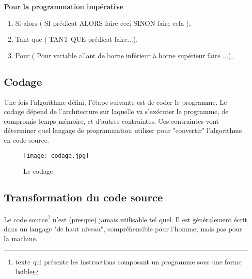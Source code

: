 \documentclass[12pt,a4paper]{article}
\begin{document}
    
    \textbf{\underline{Pour la programmation impérative}}\\
    
    \begin{enumerate}
        \item Si alors ( SI prédicat ALORS faire ceci SINON faire cela ),
        \item Tant que ( TANT QUE prédicat faire...),
        \item Pour ( Pour variable allant de borne inférieur à borne supérieur faire ...),
    \end{enumerate}

    \bigskip
    
    
    \subsection{Codage}
    Une fois l'algorithme défini, l'étape suivante est de coder le programme. Le codage dépend de l'architecture sur laquelle va s'exécuter le programme, de compromis temps-mémoire, et d'autres contraintes. Ces contraintes vont déterminer quel langage de programmation utiliser pour "convertir" l'algorithme en code source.\\
    
    
    \begin{figure}[ht]
        \centering
        \texttt{[image: codage.jpg]}
        \caption{Le codage}
        \label{fig:Le codage}
    \end{figure}
    
    
    \subsection{Transformation du code source}
    Le code source\footnote{texte qui présente les instructions composant un programme sous une forme lisible} n'est (presque) jamais utilisable tel quel. Il est généralement écrit dans un langage "de haut niveau", compréhensible pour l'homme, mais pas pour la machine.\cite{article1}
    
\end{document}
